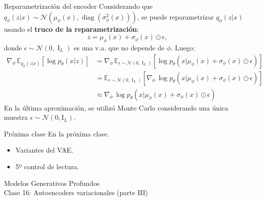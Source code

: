 \documentclass{beamer}
\begin{document}
\begin{frame}{Reparametrización del encoder}
    Considerando que $q_\phi(z|x)\sim\mathcal{N}\left(\mu_\phi(x),\operatorname{diag}(\sigma_\phi^2(x))\right)$, se puede reparametrizar $q_\phi(z|x)$ usando el \textbf{truco de la reparametrización}:
    \begin{equation*}
        z=\mu_\phi(x)+\sigma_\phi(x)\odot \epsilon,
    \end{equation*}
    donde $\epsilon\sim\mathcal{N}(0,\operatorname{I}_L)$ es una v.a. que no depende de $\phi$. Luego:
    \begin{align*}
        \nabla_\phi\,\mathbb{E}_{q_\phi(z|x)}\left[\log p_\theta(x|z)\right]
         & = \nabla_\phi\,\mathbb{E}_{\epsilon\sim\mathcal{N}(0,\operatorname{I}_L)}\left[\log p_\theta(x|\mu_\phi(x)+\sigma_\phi(x)\odot \epsilon)\right] \\
         & = \mathbb{E}_{\epsilon\sim\mathcal{N}(0,\operatorname{I}_L)}\left[\nabla_\phi\,\log p_\theta(x|\mu_\phi(x)+\sigma_\phi(x)\odot \epsilon)\right] \\
         & \approx \nabla_\phi\,\log p_\theta(x|\mu_\phi(x)+\sigma_\phi(x)\odot \epsilon)
    \end{align*}
    En la última aproximación, se utilizó Monte Carlo considerando una única muestra $\epsilon\sim\mathcal{N}(0,\text{I}_L)$.
\end{frame}

\begin{frame}{Próxima clase}
    En la próxima clase.
    \begin{itemize}
        \item Variantes del VAE.
        \item 5º control de lectura.
    \end{itemize}
\end{frame}

\begin{frame}
    \centering
    \Large{Modelos Generativos Profundos}\\
    \large{Clase 16: Autoencoders variacionales (parte III)}
\end{frame}
\end{document}
